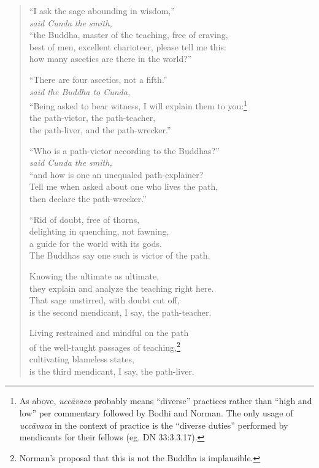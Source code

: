 \documentclass[12pt,openany]{book}%
\newcommand*{\scspeaker}[1]{\hspace{2em}\textit{#1}}
\begin{document}
\begin{verse}%
“I ask the sage abounding in wisdom,” \\
\scspeaker{said Cunda the smith, }\\
“the Buddha, master of the teaching, free of craving, \\
best of men, excellent charioteer, please tell me this: \\
how many ascetics are there in the world?” 

“There are four ascetics, not a fifth.” \\
\scspeaker{said the Buddha to Cunda, }\\
“Being asked to bear witness, I will explain them to you:\footnote{As above, \textit{\textsanskrit{uccāvaca}} probably means “diverse” practices rather than “high and low” per commentary followed by Bodhi and Norman. The only usage of \textit{\textsanskrit{uccāvaca}} in the context of practice is the “diverse duties” performed by mendicants for their fellows (eg. DN 33:3.3.17). } \\
the path-victor, the path-teacher, \\
the path-liver, and the path-wrecker.” 

“Who is a path-victor according to the Buddhas?” \\
\scspeaker{said Cunda the smith, }\\
“and how is one an unequaled path-explainer? \\
Tell me when asked about one who lives the path, \\
then declare the path-wrecker.” 

“Rid of doubt, free of thorns, \\
delighting in quenching, not fawning, \\
a guide for the world with its gods. \\
The Buddhas say one such is victor of the path. 

Knowing the ultimate as ultimate, \\
they explain and analyze the teaching right here. \\
That sage unstirred, with doubt cut off, \\
is the second mendicant, I say, the path-teacher. 

Living restrained and mindful on the path \\
of the well-taught passages of teaching,\footnote{Norman’s proposal that this is not the Buddha is implausible. } \\
cultivating blameless states, \\
is the third mendicant, I say, the path-liver. 


\end{verse}
\end{document}
